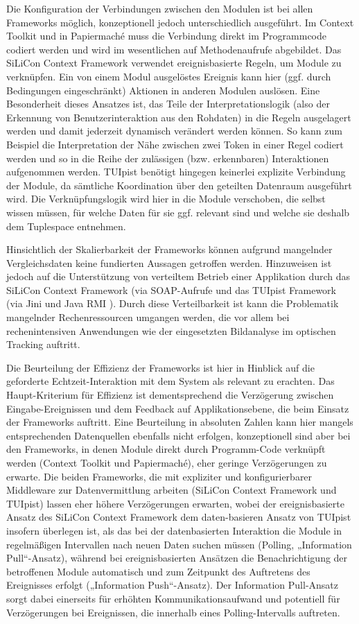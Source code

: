 Die Konfiguration der Verbindungen zwischen den Modulen ist bei allen Frameworks möglich, konzeptionell jedoch unterschiedlich ausgeführt. Im Context Toolkit und in Papiermaché muss die Verbindung direkt im Programmcode codiert werden und wird im wesentlichen auf Methodenaufrufe abgebildet. Das SiLiCon Context Framework verwendet ereignisbasierte Regeln, um Module zu verknüpfen. Ein von einem Modul ausgelöstes Ereignis kann hier (ggf. durch Bedingungen eingeschränkt) Aktionen in anderen Modulen auslösen. Eine Besonderheit dieses Ansatzes ist, das Teile der Interpretationslogik (also der Erkennung von Benutzerinteraktion aus den Rohdaten) in die Regeln ausgelagert werden und damit jederzeit dynamisch verändert werden können. So kann zum Beispiel die Interpretation der Nähe zwischen zwei Token in einer Regel codiert werden und so in die Reihe der zulässigen (bzw. erkennbaren) Interaktionen aufgenommen werden. TUIpist benötigt hingegen keinerlei explizite Verbindung der Module, da sämtliche Koordination über den geteilten Datenraum ausgeführt wird. Die Verknüpfungslogik wird hier in die Module verschoben, die selbst wissen müssen, für welche Daten für sie ggf. relevant sind und welche sie deshalb dem Tuplespace entnehmen.

Hinsichtlich der Skalierbarkeit der Frameworks können aufgrund mangelnder Vergleichsdaten keine fundierten Aussagen getroffen werden. Hinzuweisen ist jedoch auf die Unterstützung von verteiltem Betrieb einer Applikation durch das SiLiCon Context Framework (via SOAP-Aufrufe \citep{Curbera02} und das TUIpist Framework (via Jini und Java \gls{RMI} \citep{Downing98}). Durch diese Verteilbarkeit ist kann die Problematik mangelnder Rechenressourcen umgangen werden, die vor allem bei rechenintensiven Anwendungen wie der eingesetzten Bildanalyse im optischen Tracking auftritt.

Die Beurteilung der Effizienz der Frameworks ist hier in Hinblick auf die geforderte Echtzeit-Interaktion mit dem System als relevant zu erachten. Das Haupt-Kriterium für Effizienz ist dementsprechend die Verzögerung zwischen Eingabe-Ereignissen und dem Feedback auf Applikationsebene, die beim Einsatz der Frameworks auftritt. Eine Beurteilung in absoluten Zahlen kann hier mangels entsprechenden Datenquellen ebenfalls nicht erfolgen, konzeptionell sind aber bei den Frameworks, in denen Module direkt durch Programm-Code verknüpft werden (Context Toolkit und Papiermaché), eher geringe Verzögerungen zu erwarte. Die beiden Frameworks, die mit expliziter und konfigurierbarer Middleware zur Datenvermittlung arbeiten (SiLiCon Context Framework und TUIpist) lassen eher höhere Verzögerungen erwarten, wobei der ereignisbasierte Ansatz des SiLiCon Context Framework dem daten-basieren Ansatz von TUIpist insofern überlegen ist, als das bei der datenbasierten Interaktion die Module in regelmäßigen Intervallen nach neuen Daten suchen müssen (Polling, „Information Pull“-Ansatz), während bei ereignisbasierten Ansätzen die Benachrichtigung der betroffenen Module automatisch und zum Zeitpunkt des Auftretens des Ereignisses erfolgt („Information Push“-Ansatz). Der Information Pull-Ansatz sorgt dabei einerseits für erhöhten Kommunikationsaufwand und potentiell für Verzögerungen bei Ereignissen, die innerhalb eines Polling-Intervalls auftreten.


